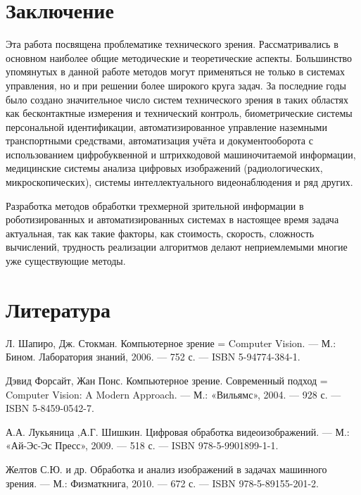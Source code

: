 \documentclass[a4paper,14pt]{extreport}
\begin{document}
\section{Заключение}
Эта работа посвящена проблематике технического зрения. Рассматривались в основном наиболее общие методические и теоретические аспекты. Большинство упомянутых в
данной работе методов могут применяться не только в системах управления, но и при решении более широкого круга задач.
За последние годы было создано значительное число систем
технического зрения в таких областях как бесконтактные измерения и технический контроль, биометрические системы персональной идентификации, автоматизированное управление наземными транспортными средствами, автоматизация учёта и документооборота с использованием цифробуквенной и штрихкодовой машиночитаемой информации, медицинские системы анализа цифровых изображений (радиологических, микроскопических), системы интеллектуального видеонаблюдения и ряд других.

Разработка методов обра­ботки трехмерной зрительной информации в роботизированных и автоматизированных системах в настоящее время задача актуальная, так как такие факторы, как стоимость, скорость, сложность вычислений, трудность реализации алгоритмов делают неприемлемыми многие уже существующие методы.





\section{Литература}
Л. Шапиро, Дж. Стокман. Компьютерное зрение = Computer Vision. — М.: Бином. Лаборатория знаний, 2006. — 752 с. — ISBN 5-94774-384-1.

Дэвид Форсайт, Жан Понс. Компьютерное зрение. Современный подход = Computer Vision: A Modern Approach. — М.: «Вильямс», 2004. — 928 с. — ISBN 5-8459-0542-7.

А.А. Лукьяница ,А.Г. Шишкин. Цифровая обработка видеоизображений. — М.: «Ай-Эс-Эс Пресс», 2009. — 518 с. — ISBN 978-5-9901899-1-1.

Желтов С.Ю. и др. Обработка и анализ изображений в задачах машинного зрения. — М.: Физматкнига, 2010. — 672 с. — ISBN 978-5-89155-201-2.	
\end{document}
